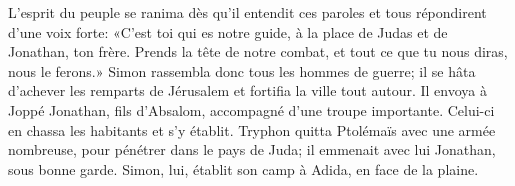 L’esprit du peuple se ranima dès qu’il entendit ces paroles
	et tous répondirent d’une voix forte:
	«C’est toi qui es notre guide, à la place de Judas et de Jonathan, ton frère.
Prends la tête de notre combat, et tout ce que tu nous diras, nous le ferons.»
Simon rassembla donc tous les hommes de guerre;
	il se hâta d’achever les remparts de Jérusalem et fortifia la ville tout autour.
Il envoya à Joppé Jonathan, fils d’Absalom, accompagné d’une troupe importante.
	Celui-ci en chassa les habitants et s’y établit.
Tryphon quitta Ptolémaïs avec une armée nombreuse, pour pénétrer dans le pays de Juda;
	il emmenait avec lui Jonathan, sous bonne garde.
Simon, lui, établit son camp à Adida, en face de la plaine.
